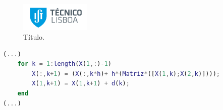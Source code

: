 \begin{figure}
    \centering
    \includegraphics[width=0.3\textwidth]{imagens/ist.png}
    \caption{Título.}
    \label{fig:exemplo.4}
\end{figure}
\vspace{-0.2cm}


\begin{lstlisting}[frame=none,language=Matlab,label={code:exemplo},backgroundcolor=\color{gray!15},numbers=none,		basicstyle=\tiny\ttfamily]
(...)
    for k = 1:length(X(1,:)-1)
        X(:,k+1) = (X(:,k*h)+ h*(Matriz*([X(1,k);X(2,k)])));
        X(1,k+1) = X(1,k+1) + d(k);
    end
(...)
\end{lstlisting}
